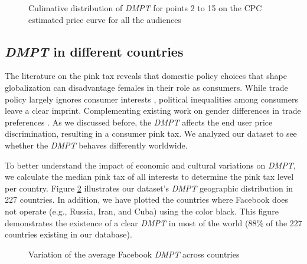 \documentclass[twocolumn]{bmcart}\usepackage{lineno}
\begin{document}
\begin{figure}[h!]
\color{blue}
    \centering
\caption{Culimative distribution of \emph{DMPT} for points 2 to 15 on the CPC estimated price curve for all the audiences }
    \label{fig:CPCPointsAll}
\end{figure}




\color{blue}
\subsection{\emph{DMPT} in different countries}\label{geopoli}

The literature on the pink tax reveals that domestic policy choices that shape globalization can disadvantage females in their role as consumers\cite{betz2021women}. While trade policy largely ignores consumer interests \cite{betz2019absence}, political inequalities among consumers leave a clear imprint. Complementing existing work on gender differences in trade preferences \cite{guisinger2017american,mansfield2015men}. As we discussed before, the \emph{DMPT} affects the end user price discrimination, resulting in a consumer pink tax. We analyzed our dataset to see whether the \emph{DMPT} behaves differently worldwide. 

To better understand the impact of economic and cultural variations on \emph{DMPT}, we calculate the median pink tax of all interests to determine the pink tax level per country. Figure \ref{fig:PinkWorld} illustrates our dataset's \emph{DMPT} geographic distribution in 227 countries. In addition, we have plotted the countries where Facebook does not operate (e.g., Russia, Iran, and Cuba) using the color black. This figure demonstrates the existence of a clear \emph{DMPT} in most of the world (88\% of the 227 countries existing in our database).


\begin{figure}[h!]
\color{blue}
    \centering
\caption{Variation of the average Facebook \emph{DMPT} across countries}
    \label{fig:PinkWorld}
\end{figure}
\end{document}
